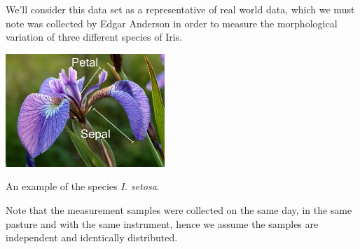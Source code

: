 \begin{frame}
We'll consider this data set as a representative of real world data, which we must note was collected by Edgar Anderson in order to measure the morphological variation of three different species of Iris.\\
\centerline{\includegraphics[width=6cm]{Iris-setosa-1.jpg}}
\centerline{An example of the species \emph{I. setosa}.}
 Note that the measurement samples were collected on the same day, in the same pasture and with the same instrument, hence we assume the samples are independent and identically distributed.
\end{frame}

